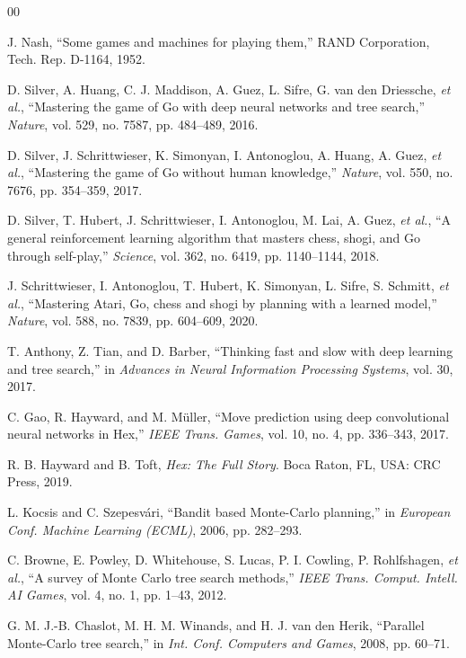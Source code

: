 \documentclass[conference]{IEEEtran}
\begin{document}
\begin{thebibliography}{00}

  J. Nash, ``Some games and machines for playing them,'' RAND Corporation, Tech. Rep. D-1164, 1952.

  D. Silver, A. Huang, C. J. Maddison, A. Guez, L. Sifre, G. van den Driessche, \emph{et al.}, ``Mastering the game of Go with deep neural networks and tree search,'' \emph{Nature}, vol. 529, no. 7587, pp. 484--489, 2016.

  D. Silver, J. Schrittwieser, K. Simonyan, I. Antonoglou, A. Huang, A. Guez, \emph{et al.}, ``Mastering the game of Go without human knowledge,'' \emph{Nature}, vol. 550, no. 7676, pp. 354--359, 2017.

  D. Silver, T. Hubert, J. Schrittwieser, I. Antonoglou, M. Lai, A. Guez, \emph{et al.}, ``A general reinforcement learning algorithm that masters chess, shogi, and Go through self-play,'' \emph{Science}, vol. 362, no. 6419, pp. 1140--1144, 2018.

  J. Schrittwieser, I. Antonoglou, T. Hubert, K. Simonyan, L. Sifre, S. Schmitt, \emph{et al.}, ``Mastering Atari, Go, chess and shogi by planning with a learned model,'' \emph{Nature}, vol. 588, no. 7839, pp. 604--609, 2020.

  T. Anthony, Z. Tian, and D. Barber, ``Thinking fast and slow with deep learning and tree search,'' in \emph{Advances in Neural Information Processing Systems}, vol. 30, 2017.

  C. Gao, R. Hayward, and M. M\"uller, ``Move prediction using deep convolutional neural networks in Hex,'' \emph{IEEE Trans. Games}, vol. 10, no. 4, pp. 336--343, 2017.

  R. B. Hayward and B. Toft, \emph{Hex: The Full Story}. Boca Raton, FL, USA: CRC Press, 2019.

  L. Kocsis and C. Szepesv\'ari, ``Bandit based Monte-Carlo planning,'' in \emph{European Conf. Machine Learning (ECML)}, 2006, pp. 282--293.

  C. Browne, E. Powley, D. Whitehouse, S. Lucas, P. I. Cowling, P. Rohlfshagen, \emph{et al.}, ``A survey of Monte Carlo tree search methods,'' \emph{IEEE Trans. Comput. Intell. AI Games}, vol. 4, no. 1, pp. 1--43, 2012.

  G. M. J.-B. Chaslot, M. H. M. Winands, and H. J. van den Herik, ``Parallel Monte-Carlo tree search,'' in \emph{Int. Conf. Computers and Games}, 2008, pp. 60--71.


\end{thebibliography}
\end{document}
